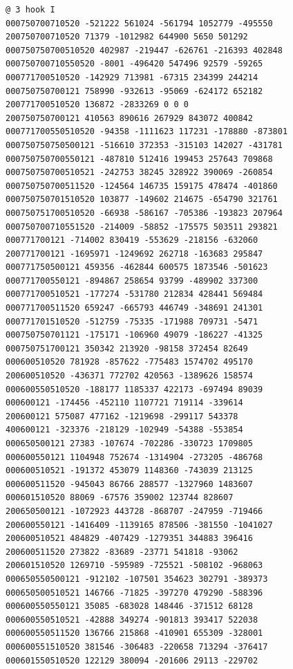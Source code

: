 \begin{Verbatim}[fontsize=\footnotesize]
@ 3 hook I
000750700710520 -521222 561024 -561794 1052779 -495550
200750700710520 71379 -1012982 644900 5650 501292
000750750700510520 402987 -219447 -626761 -216393 402848
000750700710550520 -8001 -496420 547496 92579 -59265
000771700510520 -142929 713981 -67315 234399 244214
000750750700121 758990 -932613 -95069 -624172 652182
200771700510520 136872 -2833269 0 0 0
200750750700121 410563 890616 267929 843072 400842
000771700550510520 -94358 -1111623 117231 -178880 -873801
000750750750500121 -516610 372353 -315103 142027 -431781
000750750700550121 -487810 512416 199453 257643 709868
000750750700510521 -242753 38245 328922 390069 -260854
000750750700511520 -124564 146735 159175 478474 -401860
000750750701510520 103877 -149602 214675 -654790 321761
000750751700510520 -66938 -586167 -705386 -193823 207964
000750700710551520 -214009 -58852 -175575 503511 293821
000771700121 -714002 830419 -553629 -218156 -632060
200771700121 -1695971 -1249692 262718 -163683 295847
000771750500121 459356 -462844 600575 1873546 -501623
000771700550121 -894867 258654 93799 -489902 337300
000771700510521 -177274 -531780 212834 428441 569484
000771700511520 659247 -665793 446749 -348691 241301
000771701510520 -512759 -75335 -171988 709731 -5471
000750750701121 -175171 -106960 49079 -186227 -41325
000750751700121 350342 213920 -98158 372454 82649
000600510520 781928 -857622 -775483 1574702 495170
200600510520 -436371 772702 420563 -1389626 158574
000600550510520 -188177 1185337 422173 -697494 89039
000600121 -174456 -452110 1107721 719114 -339614
200600121 575087 477162 -1219698 -299117 543378
400600121 -323376 -218129 -102949 -54388 -553854
000650500121 27383 -107674 -702286 -330723 1709805
000600550121 1104948 752674 -1314904 -273205 -486768
000600510521 -191372 453079 1148360 -743039 213125
000600511520 -945043 86766 288577 -1327960 1483607
000601510520 88069 -67576 359002 123744 828607
200650500121 -1072923 443728 -868707 -247959 -719466
200600550121 -1416409 -1139165 878506 -381550 -1041027
200600510521 484829 -407429 -1279351 344883 396416
200600511520 273822 -83689 -23771 541818 -93062
200601510520 1269710 -595989 -725521 -508102 -968063
000650550500121 -912102 -107501 354623 302791 -389373
000650500510521 146766 -71825 -397270 479290 -588396
000600550550121 35085 -683028 148446 -371512 68128
000600550510521 -42888 349274 -901813 393417 522038
000600550511520 136766 215868 -410901 655309 -328001
000600551510520 381546 -306483 -220658 713294 -376417
000601550510520 122129 380094 -201606 29113 -229702

\end{Verbatim}
